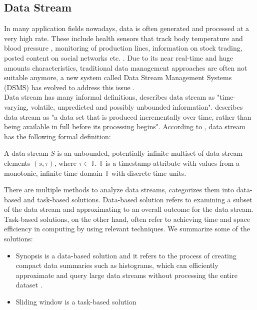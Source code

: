 \documentclass[runningheads]{llncs}
\begin{document}

\subsection{Data Stream}
In many application fields nowadays, data is often generated and processed at a very high rate. These include health sensors that track body temperature and blood pressure \cite{Geisler13},
monitoring of production lines, information on stock trading, posted content on social networks etc. \cite{Geisler16}. Due to its near real-time and huge amounts characteristics, traditional data management
approaches are often not suitable anymore, a new system called Data Stream Management Systems (DSMS) has evolved to address this issue \cite{Geisler16}. \\
\noindent \newline
Data stream has many informal definitions, \cite{Patro06} describes data stream as "time-varying, volatile, unpredicted and possibly unbounded information". \cite{Golab03} describes data stream as
"a data set that is produced incrementally over time, rather than being available in full before its processing begins". According to \cite{Geisler13}, data stream has the following formal definition:
\begin{definition}
  A data stream $S$ is an unbounded, potentially infinite multiset of data stream elements $(s,\tau)$, where $\tau \in \mathbb{T}$. $\mathbb{T}$ is a timestamp attribute with values from a monotonic, infinite time domain $\mathbb{T}$ with discrete time units.
\end{definition} 
\noindent
There are multiple methods to analyze data streams, \cite{Gaber05} categorizes them into data-based and task-based solutions. Data-based solution refers to examining a subset of the data stream and approximating to an
overall outcome for the data stream. Task-based solutions, on the other hand, often refer to achieving time and space efficiency in computing by using relevant techniques. We summarize some of the solutions:
\begin{itemize}
  \item Synopsis is a data-based solution and it refers to the process of creating compact data summaries such as histograms, which can efficiently approximate and query large data streams without processing the entire dataset \cite{Gaber05}.
  \item Sliding window is a task-based solution
\end{itemize}
\end{document}
